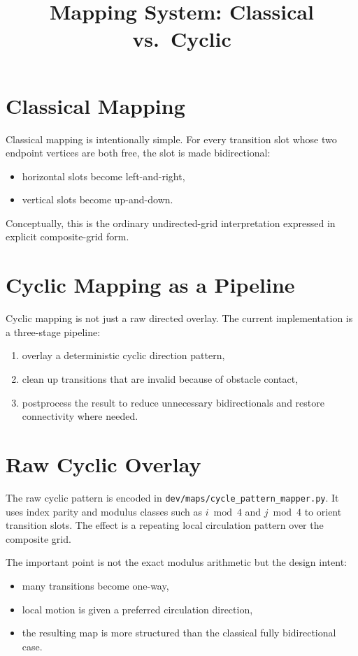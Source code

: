 \documentclass[11pt]{article}
\title{Mapping System: Classical vs.\ Cyclic}
\author{}
\date{}
\begin{document}
\maketitle

\section{Classical Mapping}

Classical mapping is intentionally simple. For every transition slot whose two endpoint vertices are both free, the slot is made bidirectional:
\begin{itemize}[leftmargin=2em]
    \item horizontal slots become left-and-right,
    \item vertical slots become up-and-down.
\end{itemize}

Conceptually, this is the ordinary undirected-grid interpretation expressed in explicit composite-grid form.

\section{Cyclic Mapping as a Pipeline}

Cyclic mapping is not just a raw directed overlay. The current implementation is a three-stage pipeline:
\begin{enumerate}[leftmargin=2em]
    \item overlay a deterministic cyclic direction pattern,
    \item clean up transitions that are invalid because of obstacle contact,
    \item postprocess the result to reduce unnecessary bidirectionals and restore connectivity where needed.
\end{enumerate}

\section{Raw Cyclic Overlay}

The raw cyclic pattern is encoded in \texttt{dev/maps/cycle\_pattern\_mapper.py}. It uses index parity and modulus classes such as \(i \bmod 4\) and \(j \bmod 4\) to orient transition slots. The effect is a repeating local circulation pattern over the composite grid.

The important point is not the exact modulus arithmetic but the design intent:
\begin{itemize}[leftmargin=2em]
    \item many transitions become one-way,
    \item local motion is given a preferred circulation direction,
    \item the resulting map is more structured than the classical fully bidirectional case.
\end{itemize}
\end{document}
